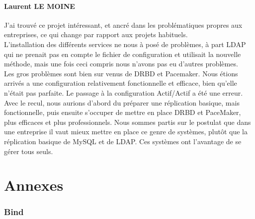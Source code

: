 \documentclass[11pt,a4paper]{report}
\begin{document}
            \subsection{Laurent \textsc{LE MOINE}}
                
                J'ai trouv\'e ce projet int\'eressant, et ancr\'e dans les probl\'ematiques propres aux entreprises, ce qui change par rapport aux projets habituels.\\
                
                L'installation des diff\'erents services ne nous \`a pos\'e de probl\`emes, \`a part LDAP qui ne prenait pas en compte le fichier de configuration et utilisait la nouvelle m\'ethode, mais une fois ceci compris nous n'avons pas eu d'autres probl\`emes.\\
                
                Les gros probl\`emes sont bien sur venus de DRBD et Pacemaker. Nous \'etions arriv\'es a une configuration relativement fonctionnelle et efficace, bien qu'elle n'\'etait pas parfaite. Le passage \`a la configuration Actif/Actif a \'et\'e une erreur.\\
                
                Avec le recul, nous aurions d'abord du pr\'eparer une r\'eplication basique, mais fonctionnelle, puis ensuite s'occuper de mettre en place DRBD et PaceMaker, plus efficaces et plus professionnels. Nous sommes partis sur le postulat que dans une entreprise il vaut mieux mettre en place ce genre de syst\`emes, plut\^ot que la r\'eplication basique de MySQL et de LDAP. Ces syst\`emes ont l'avantage de se g\'erer tous seuls.
                
                \vfill
                \flushleft{}
    
    \appendix
    
    \part{Annexes}
    
        \section{Bind} \label{bind}
            
\end{document}
